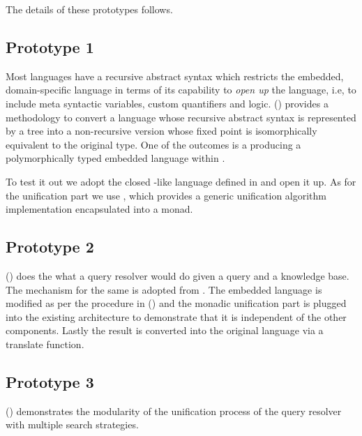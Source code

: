 \documentclass[thesis-solanki.tex]{subfiles}
\begin{document}
The details of these prototypes follows.

\subsection{Prototype 1}

Most languages have a recursive abstract syntax which restricts the embedded, domain-specific language
  in terms of its capability to \textit{open up} the language, i.e, to include meta syntactic
  variables, custom quantifiers and logic.
  () provides a methodology to convert a language whose recursive abstract
  syntax is represented by a tree into a non-recursive version whose fixed point is isomorphically equivalent to
  the original type.
  One of the outcomes is a producing a polymorphically typed embedded language within .

  To test it out we adopt the closed -like language defined in \cite{prolog-lib} and open it up.
  As for the unification part we use \cite{unification-fd-lib}, which provides a generic unification algorithm
  implementation encapsulated into a monad.


\subsection{Prototype 2}

  () does the what a  query resolver would do given a
  query and a knowledge base.
  The mechanism for the same is adopted from \cite{prolog-lib}.
  The embedded language is modified as per the procedure in () and the
  monadic unification part is plugged into the existing architecture to demonstrate that it is independent of the
  other components.
  Lastly the result is converted into the original language via a translate function.

\subsection{Prototype 3}

  () demonstrates the modularity of the unification process of the query
  resolver with multiple search strategies.
\end{document}
